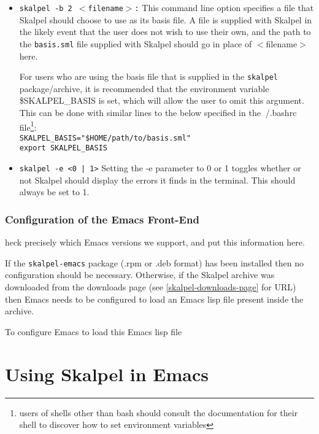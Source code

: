 \documentclass{report}
\newcommand{\note}[2][] {\todo[color=RoyalBlue, #1]{Note: #2}}
\begin{document}
\begin{itemize}
\item \texttt{skalpel -b 2 $<$filename$>$:} This command line option
  specifies a file that Skalpel should choose to use as its basis
  file. A file is supplied with Skalpel in the likely event that the
  user does not wish to use their own, and the path to the
  \texttt{basis.sml} file supplied with Skalpel should go in place of
  $<$filename$>$ here.

  For users who are using the basis file that is supplied in the
  \texttt{skalpel} package/archive, it is recommended that the
  environment variable \$SKALPEL\_BASIS is set, which will allow the
  user to omit this argument. This can be done with similar lines to
  the below specified in the $~$/.bashrc file\footnote{users of shells
    other than bash should consult the documentation for their shell
    to discover how to set environment variables}:\\

  \texttt{SKALPEL\_BASIS="\$HOME/path/to/basis.sml"}\\
  \texttt{export SKALPEL\_BASIS}

\item \texttt{skalpel -e <0 | 1>} Setting the -e parameter to 0 or 1
  toggles whether or not Skalpel should display the errors it finds in
  the terminal. This should always be set to 1. 
\end{itemize}


\subsection{Configuration of the Emacs Front-End}

\note[inline] Check precisely which Emacs versions we support, and put
this information here.

If the \texttt{skalpel-emacs} package (.rpm or .deb format) has been
installed then no configuration should be necessary. Otherwise, if the
Skalpel archive was downloaded from the downloads page (see
\ref{skalpel-downloads-page} for URL) then Emacs needs to be
configured to load an Emacs lisp file present inside the archive.

To configure Emacs to load this Emacs lisp file

\chapter{Using Skalpel in Emacs}
\end{document}
